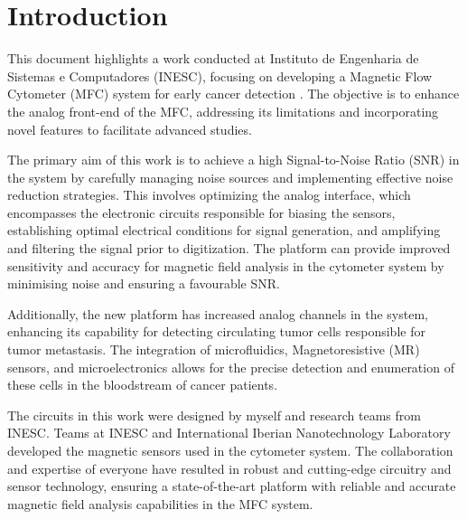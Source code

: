 \section{Introduction}
\label{sec:intro}

This document highlights a work conducted at Instituto de Engenharia de Sistemas e Computadores (INESC), focusing on developing a Magnetic Flow Cytometer (MFC) system for early cancer detection \cite{JoseC_thesis, PMID24761029}. The objective is to enhance the analog front-end of the MFC, addressing its limitations and incorporating novel features to facilitate advanced studies.

The primary aim of this work is to achieve a high Signal-to-Noise Ratio (SNR) in the system by carefully managing noise sources and implementing effective noise reduction strategies. This involves optimizing the analog interface, which encompasses the electronic circuits responsible for biasing the sensors, establishing optimal electrical conditions for signal generation, and amplifying and filtering the signal prior to digitization. The platform can provide improved sensitivity and accuracy for magnetic field analysis in the cytometer system by minimising noise and ensuring a favourable SNR.

Additionally, the new platform has increased analog channels in the system, enhancing its capability for detecting circulating tumor cells responsible for tumor metastasis. The integration of microfluidics, Magnetoresistive (MR) sensors, and microelectronics allows for the precise detection and enumeration of these cells in the bloodstream of cancer patients.

The circuits in this work were designed by myself and research teams from INESC. Teams at INESC and International Iberian Nanotechnology Laboratory developed the magnetic sensors used in the cytometer system. The collaboration and expertise of everyone have resulted in robust and cutting-edge circuitry and sensor technology, ensuring a state-of-the-art platform with reliable and accurate magnetic field analysis capabilities in the MFC system.